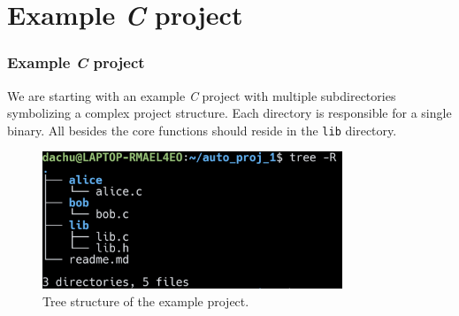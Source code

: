 \section{Example \textit{C} project}

\begin{frame}
    \frametitle{Example \textit{C} project}

    We are starting with an example \textit{C} project with \alert{multiple subdirectories} symbolizing a complex project structure. Each directory is responsible for a single binary. All besides the core functions should reside in the \texttt{lib} directory.

    \begin{figure}[H]
        \centering
        \includegraphics[width=0.8\textwidth]{../figure/init_state.png}
        \caption*{Tree structure of the example project.}
    \end{figure}
\end{frame}

